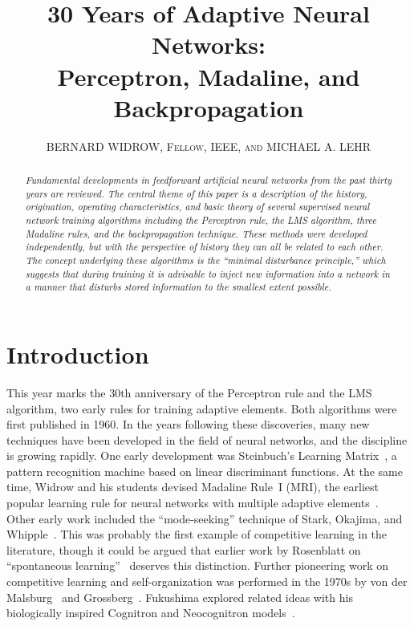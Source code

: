 \documentclass[10pt,twocolumn]{article}
\title{\vspace{-2em}\textbf{\Large 30 Years of Adaptive Neural Networks:\\
Perceptron, Madaline, and Backpropagation}}
\author{BERNARD WIDROW, \textsc{Fellow, IEEE}, \textsc{and} MICHAEL A. LEHR}
\date{}
\begin{document}
\maketitle
\thispagestyle{empty}

\begin{abstract}\small\itshape
Fundamental developments in feedforward artificial neural networks from the
past thirty years are reviewed. The central theme of this paper is a
description of the history, origination, operating characteristics, and basic
theory of several supervised neural network training algorithms including the
Perceptron rule, the LMS algorithm, three Madaline rules, and the
backpropagation technique. These methods were developed independently, but
with the perspective of history they can all be related to each other. The
concept underlying these algorithms is the ``minimal disturbance principle,''
which suggests that during training it is advisable to inject new information
into a network in a manner that disturbs stored information to the smallest
extent possible.
\end{abstract}

\section{Introduction}
This year marks the 30th anniversary of the Perceptron rule and the LMS
algorithm, two early rules for training adaptive elements. Both algorithms were
first published in 1960. In the years following these discoveries, many new
techniques have been developed in the field of neural networks, and the
discipline is growing rapidly. One early development was Steinbuch's Learning
Matrix~\cite{steinbuch}, a pattern recognition machine based on linear
discriminant functions. At the same time, Widrow and his students devised
Madaline Rule~I (MRI), the earliest popular learning rule for neural networks
with multiple adaptive elements~\cite{widrow62}. Other early work included the
``mode-seeking'' technique of Stark, Okajima, and Whipple~\cite{stark}. This
was probably the first example of competitive learning in the literature,
though it could be argued that earlier work by Rosenblatt on ``spontaneous
learning''~\cite{rosen58,rosen62} deserves this distinction. Further pioneering
work on competitive learning and self-organization was performed in the 1970s
by von der Malsburg~\cite{malsburg} and Grossberg~\cite{gross76a}. Fukushima
explored related ideas with his biologically inspired Cognitron and
Neocognitron models~\cite{fuku75,fuku80}.
\end{document}
